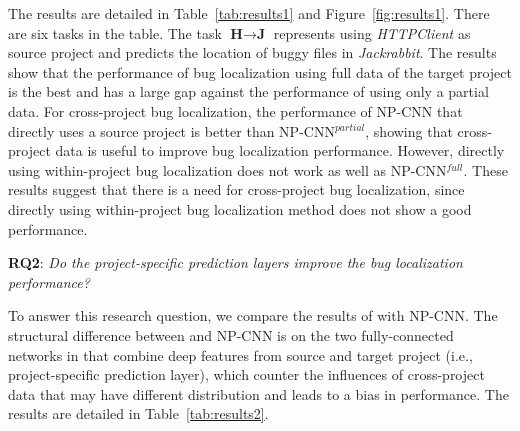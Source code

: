 The results are detailed in Table~\ref{tab:results1} and Figure~\ref{fig:results1}. There are six tasks in the table.%
The task $\textbf{H} \rightarrow \textbf{J}$ represents using \textit{HTTPClient} as source project and predicts the location of buggy files in \textit{Jackrabbit}. The results show that the performance of bug localization using full data of the target project is the best and has a large gap against the performance of using only a partial data. For cross-project bug localization, the performance of NP-CNN that directly uses a source project is better than NP-CNN$^{partial}$, showing that cross-project data is useful to improve bug localization performance. However, directly using within-project bug localization does not work as well as NP-CNN$^{full}$. These results suggest that there is a need for cross-project bug localization, since directly using within-project bug localization method does not show a good performance.

\textbf{RQ2}: \textit{Do the project-specific prediction layers improve the bug localization performance?}

To answer this research question, we compare the results of \TRANPCNN with NP-CNN. The structural difference between \TRANPCNN and NP-CNN is on the two fully-connected networks in \TRANPCNN that combine deep features from source and target project (i.e., project-specific prediction layer), which counter the influences of cross-project data that may have different distribution and leads to a bias in performance. The results are detailed in Table~\ref{tab:results2}.


